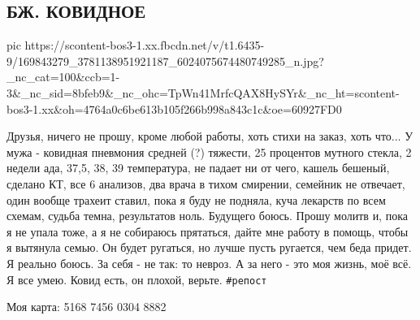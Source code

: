  
 
 
 
 

\subsection{БЖ. КОВИДНОЕ}
\label{sec:06_04_2021.fb.bilchenko_evgenia.1.covid_pomosch}

\ifcmt
  pic https://scontent-bos3-1.xx.fbcdn.net/v/t1.6435-9/169843279_3781138951921187_6024075674480749285_n.jpg?_nc_cat=100&ccb=1-3&_nc_sid=8bfeb9&_nc_ohc=TpWn41MrfcQAX8HySYr&_nc_ht=scontent-bos3-1.xx&oh=4764a0c6be613b105f266b998a843c1c&oe=60927FD0
\fi

Друзья, ничего не прошу, кроме любой работы, хоть стихи на заказ, хоть что... У
мужа - ковидная пневмония средней (?) тяжести, 25 процентов мутного стекла,  2
недели ада, 37,5, 38, 39 температура, не падает ни от чего, кашель бешеный,
сделано КТ, все 6 анализов, два врача в тихом смирении, семейник не отвечает,
один вообще трахеит ставил, пока я буду не подняла, куча лекарств по всем
схемам, судьба темна, результатов ноль. Будущего боюсь. Прошу молитв и, пока я
не упала тоже, а я не собираюсь прятаться, дайте мне работу в помощь, чтобы я
вытянула семью. Он будет ругаться, но лучше пусть ругается, чем беда придет. Я
реально боюсь. За себя - не так: то невроз. А за него - это моя жизнь, моё всё.
Я все умею. Ковид есть, он плохой, верьте. \verb|#репост|

Моя карта: 5168 7456 0304 8882

